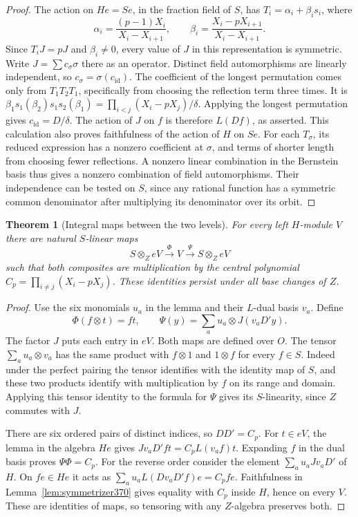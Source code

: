 \documentclass[a4paper,11pt]{article}
\newtheorem{theorem}[proposition]{Theorem}
\theoremstyle{definition}
\theoremstyle{remark}
\numberwithin{equation}{section}
\begin{document}
\begin{proof}
The action on \(He=Se\), in the fraction field of \(S\),
has \(T_i=\alpha_i+\beta_i s_i\), where
\[
 \alpha_i=\frac{(p-1)X_i}{X_i-X_{i+1}},\qquad
 \beta_i=\frac{X_i-pX_{i+1}}{X_i-X_{i+1}} .
\]
Since \(T_i J=pJ\) and \(\beta_i\ne0\), every value of \(J\)
in this representation is symmetric. Write \(J=\sum c_\sigma\sigma\)
there as an operator. Distinct field automorphisms are linearly
independent, so \(c_\sigma=\sigma(c_{\mathrm{id}})\).
The coefficient of the longest permutation comes only from
\(T_1T_2T_1\), specifically from choosing the reflection term
three times. It is
\(\beta_1s_1(\beta_2)s_1s_2(\beta_1)
 =\prod_{i<j}(X_i-pX_j)/\delta\).
Applying the longest permutation gives
\(c_{\mathrm{id}}=D/\delta\). The action of \(J\) on \(f\)
is therefore \(L(Df)\), as asserted. This calculation also
proves faithfulness of the action of \(H\) on \(Se\).
For each \(T_\sigma\), its reduced expression has a nonzero
coefficient at \(\sigma\), and terms of shorter length from
choosing fewer reflections. A nonzero linear combination
in the Bernstein basis thus gives a nonzero combination of
field automorphisms. Their independence can be tested on
\(S\), since any rational function has a symmetric common
denominator after multiplying its denominator over its orbit.
\end{proof}

\begin{theorem}[Integral maps between the two levels]
\label{thm:iwahori370}
For every left \(H\)-module \(V\) there are natural \(S\)-linear
maps
\[
       S\otimes_Z eV\xrightarrow{\ \Phi\ } V
                  \xrightarrow{\ \Psi\ } S\otimes_Z eV
\]
such that both composites are multiplication by the central
polynomial \(C_p=\prod_{i\ne j}(X_i-pX_j)\). These identities
persist under all base changes of \(Z\).
\end{theorem}
\begin{proof}
Use the six monomials \(u_a\) in the lemma and their \(L\)-dual
basis \(v_a\). Define
\[
       \Phi(f\otimes t)=ft,\qquad
       \Psi(y)=\sum_a u_a\otimes J(v_aD' y).
\]
The factor \(J\) puts each entry in \(eV\). Both maps are
defined over \(O\). The tensor \(\sum_a u_a\otimes v_a\)
has the same product with \(f\otimes1\) and \(1\otimes f\)
for every \(f\in S\). Indeed under the perfect pairing the
tensor identifies with the identity map of \(S\), and these
two products identify with multiplication by \(f\) on its
range and domain. Applying this tensor identity to the formula
for \(\Psi\) gives its \(S\)-linearity, since \(Z\) commutes
with \(J\).

There are six ordered pairs of distinct indices, so \(DD'=C_p\).
For \(t\in eV\), the lemma in the algebra \(He\) gives
\(J v_a D'f t=C_p L(v_af)t\).
Expanding \(f\) in the dual basis proves \(\Psi\Phi=C_p\).
For the reverse order consider the element
\(\sum_a u_a J v_aD'\) of \(H\). On \(f e\in He\) it acts
as \(\sum_a u_a L(Dv_aD'f)e=C_p f e\). Faithfulness in
Lemma~\ref{lem:symmetrizer370} gives equality with \(C_p\)
inside \(H\), hence on every \(V\). These are identities
of maps, so tensoring with any \(Z\)-algebra preserves both.
\end{proof}
\end{document}

